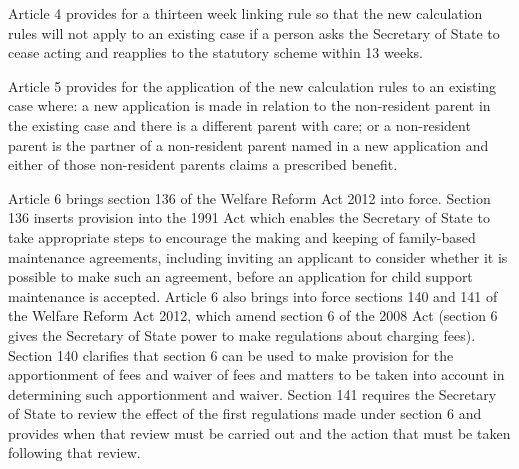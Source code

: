 \documentclass[12pt,a4paper]{article}
\begin{document}
Article 4 provides for a thirteen week linking rule so that the new calculation rules will not apply to an existing case if a person asks the Secretary of State to cease acting and reapplies to the statutory scheme within 13 weeks.

Article 5 provides for the application of the new calculation rules to an existing case where: a new application is made in relation to the non-resident parent in the existing case and there is a different parent with care; or a non-resident parent is the partner of a non-resident parent named in a new application and either of those non-resident parents claims a prescribed benefit.

Article 6 brings section 136 of the Welfare Reform Act 2012 into force. Section 136 inserts provision into the 1991 Act which enables the Secretary of State to take appropriate steps to encourage the making and keeping of family-based maintenance agreements, including inviting an applicant to consider whether it is possible to make such an agreement, before an application for child support maintenance is accepted. Article 6 also brings into force sections 140 and 141 of the Welfare Reform Act 2012, which amend section 6 of the 2008 Act (section 6 gives the Secretary of State power to make regulations about charging fees). Section 140 clarifies that section 6 can be used to make provision for the apportionment of fees and waiver of fees and matters to be taken into account in determining such apportionment and waiver. Section 141 requires the Secretary of State to review the effect of the first regulations made under section 6 and provides when that review must be carried out and the action that must be taken following that review. 
\end{document}
